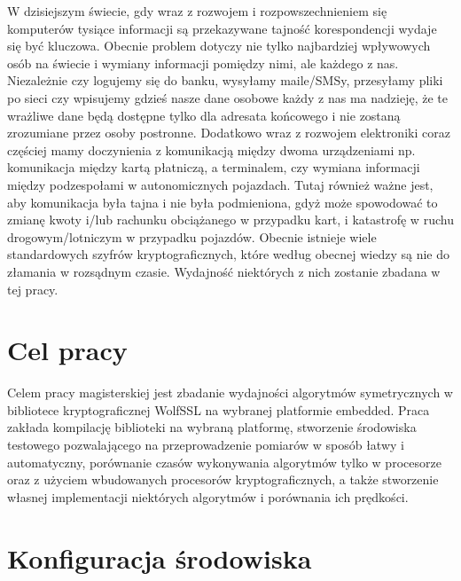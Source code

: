 \documentclass[oneside]{mgr}
\begin{document}
W dzisiejszym świecie, gdy wraz z rozwojem i rozpowszechnieniem się komputerów tysiące informacji są przekazywane tajność korespondencji wydaje się być kluczowa. Obecnie problem dotyczy nie tylko najbardziej wpływowych osób na świecie i wymiany informacji pomiędzy nimi, ale każdego z nas. Niezależnie czy logujemy się do banku, wysyłamy maile/SMSy, przesyłamy pliki po sieci czy wpisujemy gdzieś nasze dane osobowe każdy z nas ma nadzieję, że te wrażliwe dane będą dostępne tylko dla adresata końcowego i nie zostaną zrozumiane przez osoby postronne. Dodatkowo wraz z rozwojem elektroniki coraz częściej mamy doczynienia z komunikacją między dwoma urządzeniami np. komunikacja między kartą płatniczą, a terminalem, czy wymiana informacji między podzespołami w autonomicznych pojazdach. Tutaj również ważne jest, aby komunikacja była tajna i nie była podmieniona, gdyż może spowodować to zmianę kwoty i/lub rachunku obciążanego w przypadku kart, i katastrofę w ruchu drogowym/lotniczym w przypadku pojazdów. Obecnie istnieje wiele standardowych szyfrów kryptograficznych, które według obecnej wiedzy są nie do złamania w rozsądnym czasie. Wydajność niektórych z nich zostanie zbadana w tej pracy.

\chapter{Cel pracy}

Celem pracy magisterskiej jest zbadanie wydajności algorytmów symetrycznych w bibliotece kryptograficznej WolfSSL na wybranej platformie embedded. Praca zakłada kompilację biblioteki na wybraną platformę, stworzenie środowiska testowego pozwalającego na  przeprowadzenie pomiarów w sposób łatwy i automatyczny, porównanie czasów wykonywania algorytmów tylko w procesorze oraz z użyciem wbudowanych procesorów kryptograficznych, a także stworzenie własnej implementacji niektórych algorytmów i porównania ich prędkości.
\chapter{Konfiguracja środowiska}
\end{document}
